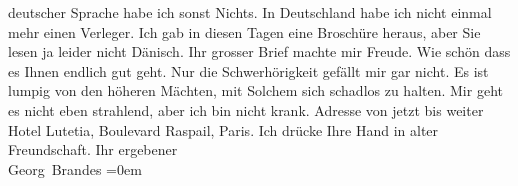 \begin{ledgroupsized}[t]{13cm}
                    deutscher Sprache habe ich sonst Nichts. In Deutschland habe ich nicht einmal mehr einen Verleger. Ich gab in
                    diesen Tagen eine Broschüre
                    heraus, aber Sie lesen ja leider nicht Dänisch.\pend
           \pstart
           Ihr grosser Brief machte mir Freude. Wie schön dass es Ihnen endlich gut geht.
                    Nur die Schwerhörigkeit gefällt mir gar nicht. Es ist lumpig von den höheren
                    Mächten, mit Solchem sich schadlos zu halten.\pend
           \pstart
           Mir geht es nicht eben strahlend, aber ich bin nicht krank. Adresse von jetzt bis
                    weiter Hotel Lutetia, Boulevard Raspail, Paris.\pend
           \pstart
           Ich drücke Ihre Hand in alter Freundschaft.\pend
           \pstart
           Ihr ergebener{\\[\baselineskip]}\spacefill\mbox{Georg Brandes}\pend
           \leftskip=0em{}
         
         \endnumbering{}\end{ledgroupsized}  \newcommand{\dateiname}{L02016}\newcommand{\titel}{Georg Brandes an Arthur Schnitzler, 11. 4. 1911}\newcommand{\editorInnen}{Martin Anton Müller und Gerd-Hermann Susen}
      